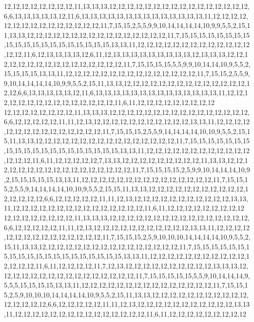 12,12,12,12,12,12,12,12,11,13,13,13,12,12,12,12,12,12,12,12,12,12,12,12,12,12,12,12,6,6,13,13,13,13,13,12,11,6,13,13,13,13,13,13,13,13,13,13,13,13,13,13,11,12,12,12,12,12,12,12,12,12,12,12,12,12,12,12,11,7,15,15,2,5,5,9,9,10,14,14,14,14,10,9,9,5,5,2,15,11,13,13,12,12,12,12,12,12,12,12,12,12,12,12,12,12,12,12,11,7,15,15,15,15,15,15,15,15,15,15,15,15,15,15,15,15,15,15,15,15,13,13,11,12,12,12,12,12,12,12,12,12,12,12,12,12,12,12,11,6,12,13,13,13,13,12,6,11,12,13,13,13,13,13,13,13,13,13,12,13,13,13,12,12,12,12,12,12,12,12,12,12,12,12,12,12,12,12,11,7,15,15,15,15,5,5,9,9,10,14,14,10,9,5,5,2,15,15,15,15,13,13,11,12,12,12,12,12,12,12,12,12,12,12,12,12,12,12,11,7,15,15,2,5,5,9,9,10,14,14,14,14,10,9,9,5,5,2,15,11,13,13,12,12,12,12,12,12,12,12,12,12,12,12,12,12,12,12,6,6,13,13,13,13,13,12,11,6,13,13,13,13,13,13,13,13,13,13,13,13,13,13,11,12,12,12,12,12,12,12,12,12,12,12,12,12,12,12,11,6,11,12,12,12,12,12,12,12,12,12
12,12,12,12,12,12,12,12,11,13,13,13,12,12,12,12,12,12,12,12,12,12,12,12,12,12,12,12,6,6,12,12,12,12,12,11,11,12,13,12,12,12,12,12,12,12,12,12,12,12,13,13,11,12,12,12,12,12,12,12,12,12,12,12,12,12,12,12,11,7,15,15,15,2,5,5,9,14,14,14,14,10,10,9,5,5,2,15,15,11,13,13,12,12,12,12,12,12,12,12,12,12,12,12,12,12,12,12,11,7,15,15,15,15,15,15,15,15,15,15,15,15,15,15,15,15,15,15,15,15,13,13,11,12,12,12,12,12,12,12,12,12,12,12,12,12,12,12,11,6,11,12,12,12,12,12,7,13,13,12,12,12,12,12,12,12,12,12,11,13,13,12,12,12,12,12,12,12,12,12,12,12,12,12,12,12,12,12,11,7,15,15,15,15,2,5,9,9,10,14,14,14,10,9,2,15,15,15,15,15,13,13,11,12,12,12,12,12,12,12,12,12,12,12,12,12,12,12,11,7,15,15,15,2,5,5,9,14,14,14,14,10,10,9,5,5,2,15,15,11,13,13,12,12,12,12,12,12,12,12,12,12,12,12,12,12,12,12,6,6,12,12,12,12,12,11,11,12,13,12,12,12,12,12,12,12,12,12,12,12,13,13,11,12,12,12,12,12,12,12,12,12,12,12,12,12,12,12,11,6,11,12,12,12,12,12,12,12,12,12
12,12,12,12,12,12,12,12,11,13,13,13,12,12,12,12,12,12,12,12,12,12,12,12,12,12,12,12,6,6,12,12,12,12,12,11,11,12,13,12,12,12,12,12,12,12,12,12,12,12,13,13,11,12,12,12,12,12,12,12,12,12,12,12,12,12,12,12,11,7,15,15,15,2,5,9,10,10,10,14,14,14,14,10,9,5,5,2,15,11,13,13,12,12,12,12,12,12,12,12,12,12,12,12,12,12,12,12,11,7,15,15,15,15,15,15,15,15,15,15,15,15,15,15,15,15,15,15,15,15,13,13,11,12,12,12,12,12,12,12,12,12,12,12,12,12,12,12,11,6,11,12,12,12,12,11,7,12,13,12,12,12,12,12,12,12,12,12,12,13,13,13,12,12,12,12,12,12,12,12,12,12,12,12,12,12,12,12,11,7,15,15,15,15,15,5,5,9,10,14,14,14,9,5,5,5,15,15,15,15,13,13,11,12,12,12,12,12,12,12,12,12,12,12,12,12,12,12,11,7,15,15,15,2,5,9,10,10,10,14,14,14,14,10,9,5,5,2,15,11,13,13,12,12,12,12,12,12,12,12,12,12,12,12,12,12,12,12,6,6,12,12,12,12,12,11,11,12,13,12,12,12,12,12,12,12,12,12,12,12,13,13,11,12,12,12,12,12,12,12,12,12,12,12,12,12,12,12,11,6,11,12,12,12,12,12,12,12,12,12
